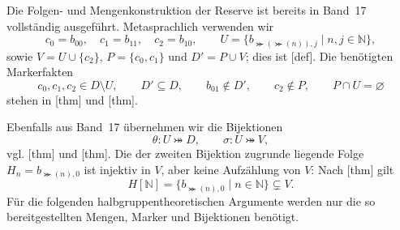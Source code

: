 \documentclass[main.tex]{subfiles}
\begin{document}
\begin{tabproof}
\end{tabproof}

Die Folgen- und Mengenkonstruktion der Reserve ist bereits in Band~17
vollständig ausgeführt. Metasprachlich verwenden wir
\[
  c_0=b_{00},\quad c_1=b_{11},\quad c_2=b_{10},\qquad
  U=\{b_{\Succ(\Succ(n)),j}\mid n,j\in\mathbb N\},
\]
sowie \(V=U\cup\{c_2\}\), \(P=\{c_0,c_1\}\) und
\(D'=P\cup V\); dies ist
[def].
Die benötigten Markerfakten
\[
  c_0,c_1,c_2\in D\setminus U,\qquad
  D'\subseteq D,\qquad b_{01}\notin D',\qquad
  c_2\notin P,\qquad P\cap U=\varnothing
\]
stehen in [thm] und
[thm].

Ebenfalls aus Band~17 übernehmen wir die Bijektionen
\[
  \theta\colon U\bij D,
  \qquad
  \sigma\colon U\bij V,
\]
vgl. [thm] und
[thm].
Die der zweiten Bijektion zugrunde liegende Folge
\(H_n=b_{\Succ(n),0}\) ist injektiv in \(V\), aber keine Aufzählung von
\(V\): Nach [thm] gilt
\[
  H[\mathbb N]
  =\{b_{\Succ(n),0}\mid n\in\mathbb N\}
  \subsetneq V.
\]
Für die folgenden halbgruppentheoretischen Argumente werden nur die so
bereitgestellten Mengen, Marker und Bijektionen benötigt.

\end{document}
